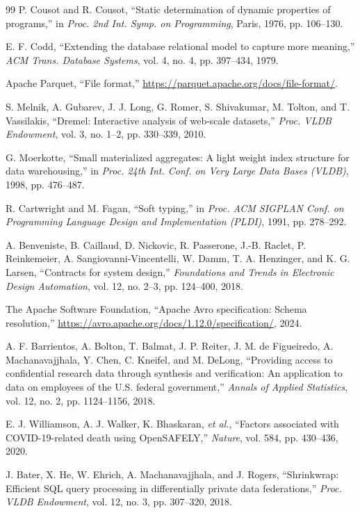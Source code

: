 \begin{thebibliography}{99}
P. Cousot and R. Cousot, ``Static determination of dynamic properties of programs,'' in \emph{Proc.
2nd Int. Symp. on Programming}, Paris, 1976, pp. 106--130.

E. F. Codd, ``Extending the database relational model to capture more meaning,'' \emph{ACM Trans.
Database Systems}, vol. 4, no. 4, pp. 397--434, 1979.

Apache Parquet, ``File format,'' \url{https://parquet.apache.org/docs/file-format/}.

S. Melnik, A. Gubarev, J. J. Long, G. Romer, S. Shivakumar, M. Tolton, and T. Vassilakis, ``Dremel:
Interactive analysis of web-scale datasets,'' \emph{Proc. VLDB Endowment}, vol. 3, no. 1--2,
pp. 330--339, 2010.

G. Moerkotte, ``Small materialized aggregates: A light weight index structure for data
warehousing,'' in \emph{Proc. 24th Int. Conf. on Very Large Data Bases (VLDB)}, 1998, pp. 476--487.

R. Cartwright and M. Fagan, ``Soft typing,'' in \emph{Proc. ACM SIGPLAN Conf. on Programming
Language Design and Implementation (PLDI)}, 1991, pp. 278--292.

A. Benveniste, B. Caillaud, D. Nickovic, R. Passerone, J.-B. Raclet, P. Reinkemeier,
A. Sangiovanni-Vincentelli, W. Damm, T. A. Henzinger, and K. G. Larsen, ``Contracts for system
design,'' \emph{Foundations and Trends in Electronic Design Automation}, vol. 12, no. 2--3,
pp. 124--400, 2018.

The Apache Software Foundation, ``Apache Avro specification: Schema resolution,''
\url{https://avro.apache.org/docs/1.12.0/specification/}, 2024.

A. F. Barrientos, A. Bolton, T. Balmat, J. P. Reiter, J. M. de Figueiredo, A. Machanavajjhala,
Y. Chen, C. Kneifel, and M. DeLong, ``Providing access to confidential research data through
synthesis and verification: An application to data on employees of the U.S. federal government,''
\emph{Annals of Applied Statistics}, vol. 12, no. 2, pp. 1124--1156, 2018.

E. J. Williamson, A. J. Walker, K. Bhaskaran, \emph{et al.}, ``Factors associated with COVID-19-related
death using OpenSAFELY,'' \emph{Nature}, vol. 584, pp. 430--436, 2020.

J. Bater, X. He, W. Ehrich, A. Machanavajjhala, and J. Rogers, ``Shrinkwrap: Efficient SQL query
processing in differentially private data federations,'' \emph{Proc. VLDB Endowment}, vol. 12, no. 3,
pp. 307--320, 2018.


\end{thebibliography}
